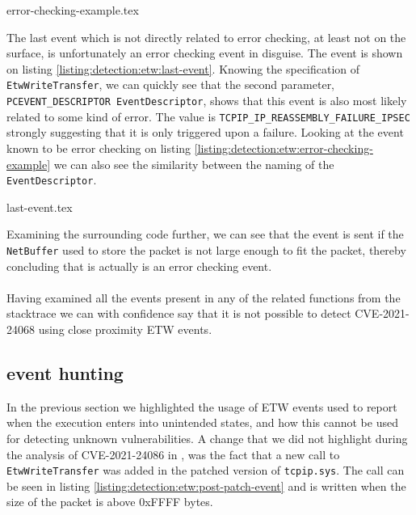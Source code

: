 \documentclass{report}
\begin{document}
{error-checking-example.tex}

The last event which is not directly related to error checking, at least not on the surface, is unfortunately an error checking event in disguise. The event is shown on listing \ref{listing:detection:etw:last-event}. Knowing the specification of \texttt{EtwWriteTransfer}\cite{url:etw:etwwritetransfer-api}, we can quickly see that the second parameter, \texttt{PCEVENT_DESCRIPTOR EventDescriptor}, shows that this event is also most likely related to some kind of error\cite{url:etw:etwwritetransfer-api}. The value is \texttt{TCPIP_IP_REASSEMBLY_FAILURE_IPSEC}\cite{url:etw:etw-event-descriptor} strongly suggesting that it is only triggered upon a failure. Looking at the event known to be error checking on listing \ref{listing:detection:etw:error-checking-example} we can also see the similarity between the naming of the \texttt{EventDescriptor}.

{last-event.tex}

Examining the surrounding code further, we can see that the event is sent if the \texttt{NetBuffer} used to store the packet is not large enough to fit the packet, thereby concluding that is actually is an error checking event.
\\
\\
Having examined all the events present in any of the related functions from the stacktrace we can with confidence say that it is not possible to detect CVE-2021-24068 using close proximity \gls{ETW} events.


\subsection{ event hunting}
In the previous section we highlighted the usage of \gls{ETW} events used to report when the execution enters into unintended states, and how this cannot be used for detecting unknown vulnerabilities. A change that we did not highlight during the analysis of CVE-2021-24086 in , was the fact that a new call to \texttt{EtwWriteTransfer} was added in the patched version of \texttt{tcpip.sys}. The call can be seen in listing \ref{listing:detection:etw:post-patch-event} and is written when the size of the packet is above 0xFFFF bytes.
\end{document}
